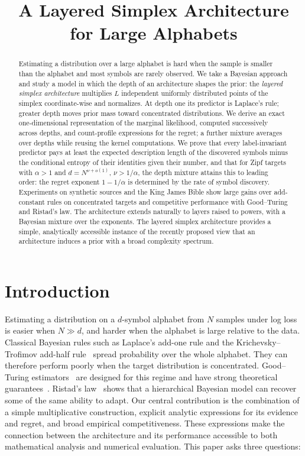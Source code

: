 \documentclass[anon]{alt2027}
\title[A Layered Simplex Architecture]{A Layered Simplex Architecture for Large Alphabets}
\begin{document}
\maketitle

\begin{abstract}
Estimating a distribution over a large alphabet is hard when the sample is smaller than the alphabet and most symbols are rarely observed. We take a Bayesian approach and study a model in which the depth of an architecture shapes the prior: the \emph{layered simplex architecture} multiplies $L$ independent uniformly distributed points of the simplex coordinate-wise and normalizes. At depth one its predictor is Laplace's rule; greater depth moves prior mass toward concentrated distributions. We derive an exact one-dimensional representation of the marginal likelihood, computed successively across depths, and count-profile expressions for the regret; a further mixture averages over depths while reusing the kernel computations. We prove that every label-invariant predictor pays at least the expected description length of the discovered symbols minus the conditional entropy of their identities given their number, and that for Zipf targets with $\alpha>1$ and $d=N^{\nu+o(1)}$, $\nu>1/\alpha$, the depth mixture attains this to leading order: the regret exponent $1-1/\alpha$ is determined by the rate of symbol discovery. Experiments on synthetic sources and the King James Bible show large gains over add-constant rules on concentrated targets and competitive performance with Good--Turing and Ristad's law. The architecture extends naturally to layers raised to powers, with a Bayesian mixture over the exponents. The layered simplex architecture provides a simple, analytically accessible instance of the recently proposed view that an architecture induces a prior with a broad complexity spectrum.
\end{abstract}

\section{Introduction}
\label{sec:intro}

Estimating a distribution on a $d$-symbol alphabet from $N$ samples under log loss is easier when $N\gg d$, and harder when the alphabet is large relative to the data. Classical Bayesian rules such as Laplace's add-one rule and the Krichevsky--Trofimov add-half rule~\citep{krichevsky1981performance} spread probability over the whole alphabet. They can therefore perform poorly when the target distribution is concentrated. Good--Turing estimators~\citep{good1953population} are designed for this regime and have strong theoretical guarantees~\citep{orlitsky2003always,mcallester2000leave,acharya2013tight,orlitsky2015competitive}. Ristad's law~\citep{ristad1995natural} shows that a hierarchical Bayesian model can recover some of the same ability to adapt. Our central contribution is the combination of a simple multiplicative construction, explicit analytic expressions for its evidence and regret, and broad empirical competitiveness. These expressions make the connection between the architecture and its performance accessible to both mathematical analysis and numerical evaluation. This paper asks three questions:
\end{document}
